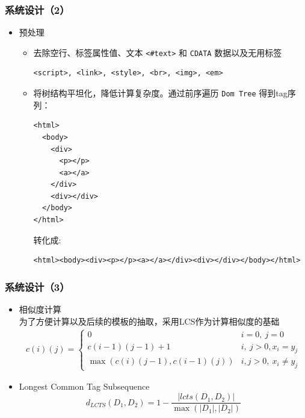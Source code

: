 \documentclass[11pt,presentation]{beamer}
\begin{document}
\begin{frame}[fragile]
\frametitle{系统设计（2）}
\label{sec-2-6}
\begin{itemize}

\item 预处理
\label{sec-2-6-1}%
\begin{itemize}
\item 去除空行、标签属性值、文本 \texttt{<\#text>} 和 \texttt{CDATA} 数据以及无用标签
  \tiny

\begin{verbatim}
<script>, <link>, <style>, <br>, <img>, <em>
\end{verbatim}
  \normalsize
\item 将树结构平坦化，降低计算复杂度。通过前序遍历 \texttt{Dom Tree} 得到tag序列：
  \tiny

\begin{verbatim}
<html>
  <body>
    <div>
      <p></p>
      <a></a>         
    </div>           
    <div></div>      
  </body>
</html>
\end{verbatim}
  \normalsize
  转化成:
  \tiny

\begin{verbatim}
<html><body><div><p></p><a></a></div><div></div></body></html>
\end{verbatim}
\end{itemize}
  

\end{itemize} %
\end{frame}
\begin{frame}
\frametitle{系统设计（3）}
\label{sec-2-7}
\begin{itemize}

\item 相似度计算\\
\label{sec-2-7-1}%
为了方便计算以及后续的模板的抽取，采用LCS作为计算相似度的基础
\begin{eqnarray*}
  c(i)(j) =
  \begin{cases}
    0 & i = 0,\: j = 0\\
    c(i-1)(j-1) + 1 & i,\: j > 0, x_i=y_j\\
    \max(c(i)(j-1), c(i-1)(j)) & i, j > 0,\: x_i \ne y_j
  \end{cases}
\end{eqnarray*}

\item Longest Common Tag Subsequence\\
\label{sec-2-7-2}%
\[
d_{LCTS}(D_1,D_2)=1-\frac{|lcts(D_1,D_2)|}{\max(|D_1|,|D_2|)}
\]

\end{itemize} %
\end{frame}
\end{document}
